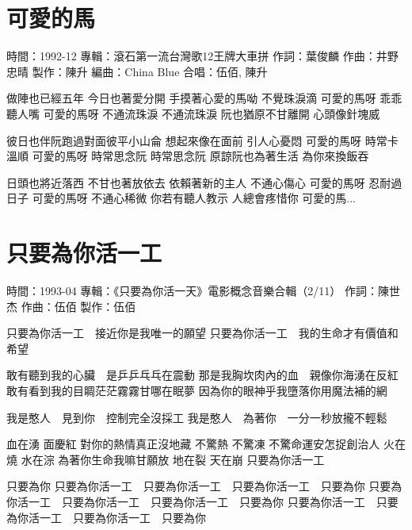 \documentclass[UTF8,a4paper,oneside,twocolumn,12pt]{ctexbook}
\newcommand{\infopair}[2]{\textbullet #1：#2}
\newcommand{\zc}[1][伍佰]{\infopair{作詞}{#1}}
\newcommand{\zq}[1][伍佰]{\infopair{作曲}{#1}}
\newcommand{\bq}[1][伍佰]{\infopair{編曲}{#1}}
\newcommand{\zj}[1]{\infopair{專輯}{#1}}
\newcommand{\zz}[1]{\infopair{製作}{#1}}
\newcommand{\sj}[1]{\infopair{時間}{#1}}
\newenvironment{info}{\begin{flushleft}\kaishu
	}
	{\end{flushleft}\normalsize\yahei\par}
\newenvironment{lyric}{
	}
{}
\begin{document}
\section{可愛的馬}
\begin{info}
	\sj{1992-12}
	\zj{滾石第一流台灣歌12王牌大車拼}
	\zc[葉俊麟]
	\zq[井野忠晴]
	\zz{陳升}
	\bq[China Blue]
	\infopair{合唱}{伍佰, 陳升}
\end{info}
\begin{lyric}
	做陣也已經五年 今日也著愛分開
	手摸著心愛的馬呦 不覺珠淚滴
	可愛的馬呀 乖乖聽人嘴
	可愛的馬呀 不通流珠淚 不通流珠淚
	阮也猶原不甘離開 心頭像針塊威

	彼日也伴阮跑過對面彼平小山侖
	想起來像在面前 引人心憂悶
	可愛的馬呀 時常卡溫順 可愛的馬呀
	時常思念阮 時常思念阮
	原諒阮也為著生活 為你來換飯吞

	日頭也將近落西 不甘也著放依去
	依賴著新的主人 不通心傷心
	可愛的馬呀 忍耐過日子
	可愛的馬呀 不通心稀微
	你若有聽人教示 人總會疼惜你 可愛的馬...
\end{lyric}

\section{只要為你活一工}
\begin{info}
	\sj{1993-04}
	\zj{《只要為你活一天》電影概念音樂合輯（2/11）}
	\zc[陳世杰]
	\zq
	\zz{伍佰}
\end{info}
\begin{lyric}
	只要為你活一工　接近你是我唯一的願望
	只要為你活一工　我的生命才有價值和希望

	敢有聽到我的心臟　是乒乒乓乓在震動
	那是我胸坎肉內的血　親像你海湧在反紅
	敢有看到我的目睭茫茫霧霧甘哪在眠夢
	因為你的眼神乎我墮落你用魔法補的網

	我是憨人　見到你　控制完全沒採工
	我是憨人　為著你　一分一秒放攏不輕鬆

	血在湧 面慶紅 對你的熱情真正沒地藏
	不驚熱 不驚凍 不驚命運安怎捉創治人
	火在燒 水在淙 為著你生命我嘛甘願放
	地在裂 天在崩 只要為你活一工

	只要為你
	只要為你活一工　只要為你活一工　只要為你活一工　只要為你
	只要為你活一工　只要為你活一工　只要為你活一工　只要為你
	只要為你活一工　只要為你活一工　只要為你活一工　只要為你
\end{lyric}
\end{document}
